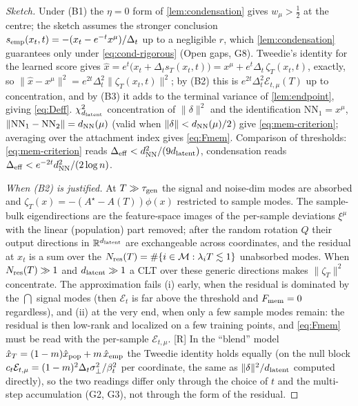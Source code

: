 \begin{proof}[Sketch]
Under (B1) the $\eta=0$ form of \cref{lem:condensation} gives $w_\mu>\tfrac12$ at the centre; the sketch assumes the stronger conclusion $s_{\rm emp}(x_t,t)=-(x_t-e^{-t}x^\mu)/\Delta_t$ up to a negligible $r$, which \cref{lem:condensation} guarantees only under \eqref{eq:cond-rigorous} (Open gaps, G8). Tweedie's identity \citep{efron2011tweedie} for the learned score gives $\hat x=e^{t}\big(x_t+\Delta_t s_T(x_t,t)\big)=x^\mu+e^{t}\Delta_t\,\zeta_T(x_t,t)$, exactly, so $\|\hat x-x^\mu\|^2=e^{2t}\Delta_t^2\|\zeta_T(x_t,t)\|^2$; by (B2) this is $e^{2t}\Delta_t^2\mathcal E_{t,\mu}(T)$ up to concentration, and by (B3) it adds to the terminal variance of \cref{lem:endpoint}, giving \eqref{eq:Deff}. $\chi^2_{d_{\mathrm{latent}}}$ concentration of $\|\delta\|^2$ and the identification $\mathrm{NN}_1=x^\mu$, $\|\mathrm{NN}_1-\mathrm{NN}_2\|=d_{\rm NN}(\mu)$ (valid when $\|\delta\|<d_{\rm NN}(\mu)/2$) give \eqref{eq:mem-criterion}; averaging over the attachment index gives \eqref{eq:Fmem}. Comparison of thresholds: \eqref{eq:mem-criterion} reads $\Delta_{\rm eff}<d_{\rm NN}^2/(9d_{\mathrm{latent}})$, condensation reads $\Delta_{\rm eff}<e^{-2t}d_{\rm NN}^2/(2\log n)$.

\emph{When (B2) is justified.} At $T\gg\tau_{\mathrm{gen}}$ the signal and noise-dim modes are absorbed and $\zeta_T(x)=-(A^\star-A(T))\phi(x)$ restricted to sample modes. The sample-bulk eigendirections are the feature-space images of the per-sample deviations $\xi^\mu$ with the linear (population) part removed; after the random rotation $Q$ their output directions in $\mathbb{R}^{d_{\mathrm{latent}}}$ are exchangeable across coordinates, and the residual at $x_t$ is a sum over the $N_{\rm res}(T)=\#\{i\in\mathcal M:\lambda_iT\lesssim1\}$ unabsorbed modes. When $N_{\rm res}(T)\gg1$ and $d_{\mathrm{latent}}\gg1$ a CLT over these generic directions makes $\|\zeta_T\|^2$ concentrate. The approximation fails (i) early, when the residual is dominated by the $\dint$ signal modes (then $\mathcal E_t$ is far above the threshold and $F_{\rm mem}=0$ regardless), and (ii) at the very end, when only a few sample modes remain: the residual is then low-rank and localized on a few training points, and \eqref{eq:Fmem} must be read with the per-sample $\mathcal E_{t,\mu}$. [R] In the ``blend'' model $\hat x_T=(1-m)\hat x_{\rm pop}+m\,\hat x_{\rm emp}$ the Tweedie identity holds equally (on the null block $c_t\mathcal E_{t,\mu}=(1-m)^2\Delta_t\sigma_{\perp}^2/\beta_t^2$ per coordinate, the same as $\|\delta\|^2/d_{\mathrm{latent}}$ computed directly), so the two readings differ only through the choice of $t$ and the multi-step accumulation (G2, G3), not through the form of the residual.
\end{proof}

